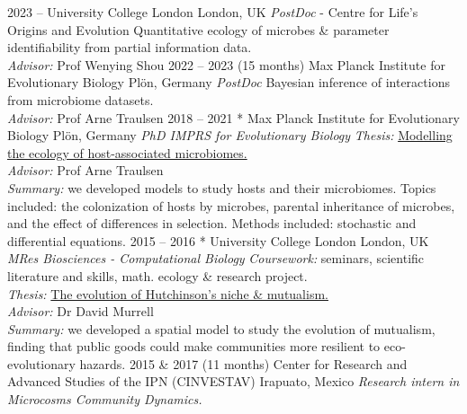 \documentclass[]{friggeri-cv} %
\begin{document}
\begin{entrylist}
\entry
{2023 -- }
{}
{University College London}
{London, UK}
{{\normalsize\emph{PostDoc} - Centre for Life's Origins and Evolution}}
{Quantitative ecology of microbes \& parameter identifiability from partial information data. \\ \emph{Advisor:}  Prof Wenying Shou}
\entry
{2022 -- 2023 }
{(15 months)}
{Max Planck Institute for Evolutionary Biology}
{Plön, Germany}
{{\normalsize\emph{PostDoc}}}
{Bayesian inference of interactions from microbiome datasets. \\ \emph{Advisor:}  Prof Arne Traulsen}
\entry
{2018 -- 2021}
{}
{* Max Planck Institute for Evolutionary Biology}
{Plön, Germany}
{{\normalsize\emph{PhD {\normalfont IMPRS for Evolutionary Biology}}}}
{\emph{Thesis:} \href{https://hdl.handle.net/21.11116/0000-000B-34D5-A}{Modelling the ecology of host-associated microbiomes.} \\ \emph{Advisor:}  Prof Arne Traulsen \\ \emph{Summary:} we developed models to study hosts and their microbiomes. Topics included: the colonization of hosts by microbes, parental inheritance of microbes, and the effect of differences in selection. Methods included: stochastic and differential equations. }%
\entry
{2015 -- 2016}
{}
{* University College London}
{London, UK}
{{\normalsize\emph{MRes {\normalfont Biosciences - Computational Biology}}} }
{\emph{Coursework:} seminars, scientific literature and skills, math. ecology \& research project. \\
\emph{Thesis:} \href{https://github.com/romanzapien/mres_thesis/blob/main/MResThesis_RomanZapienCampos.pdf}{The evolution of Hutchinson’s niche \& mutualism.} \\ \emph{Advisor:} Dr David Murrell \\ \emph{Summary:} we developed a spatial model to study the evolution of mutualism, finding that public goods could make communities more resilient to eco-evolutionary hazards.}
\entry
{2015 \& 2017}
{(11 months)}
{Center for Research and Advanced Studies of the IPN (CINVESTAV)}
{Irapuato, Mexico}
{{\normalsize\emph{Research intern in Microcosms Community Dynamics.}}}

\end{entrylist}
\end{document}
